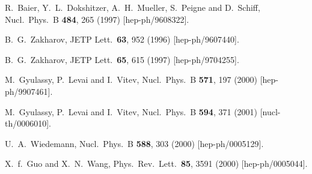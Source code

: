 \documentclass[letter,11pt]{article}
\begin{document}
\begin{thebibliography}{99}
  R.~Baier, Y.~L.~Dokshitzer, A.~H.~Mueller, S.~Peigne and D.~Schiff,
  Nucl.\ Phys.\ B {\bf 484}, 265 (1997)
  [hep-ph/9608322].

  B.~G.~Zakharov,
  JETP Lett.\  {\bf 63}, 952 (1996)
  [hep-ph/9607440].

  B.~G.~Zakharov,
  JETP Lett.\  {\bf 65}, 615 (1997)
  [hep-ph/9704255].

  M.~Gyulassy, P.~Levai and I.~Vitev,
  Nucl.\ Phys.\ B {\bf 571}, 197 (2000)
  [hep-ph/9907461].

  M.~Gyulassy, P.~Levai and I.~Vitev,
  Nucl.\ Phys.\ B {\bf 594}, 371 (2001)
  [nucl-th/0006010].

  U.~A.~Wiedemann,
  Nucl.\ Phys.\ B {\bf 588}, 303 (2000)
  [hep-ph/0005129].

  X.~f.~Guo and X.~N.~Wang,
  Phys.\ Rev.\ Lett.\  {\bf 85}, 3591 (2000)
  [hep-ph/0005044].
 

\end{thebibliography}
\end{document}
